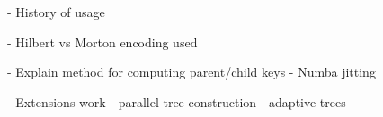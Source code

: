 - History of usage

- Hilbert vs Morton encoding used

- Explain method for computing parent/child keys
    - Numba jitting

- Extensions work
    - parallel tree construction
    - adaptive trees
